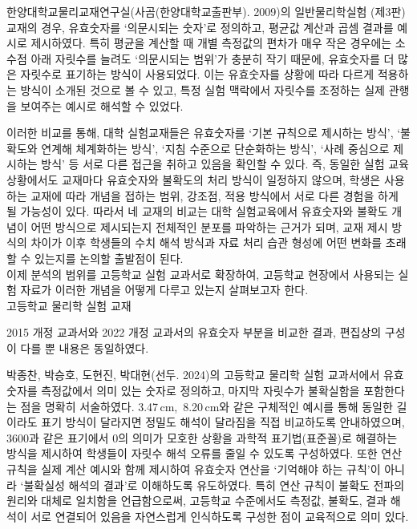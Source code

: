 한양대학교물리교재연구실(사곰(한양대학교출판부). 2009)의
일반물리학실험 (제3판) 교재의 경우,
유효숫자를 `의문시되는 숫자'로 정의하고, 평균값 계산과 곱셈 결과를 예시로 제시하였다.
특히 평균을 계산할 때 개별 측정값의 편차가 매우 작은 경우에는 소수점 아래 자릿수를 늘려도
`의문시되는 범위'가 충분히 작기 때문에, 유효숫자를 더 많은 자릿수로 표기하는 방식이 사용되었다.
이는 유효숫자를 상황에 따라 다르게 적용하는 방식이 소개된 것으로 볼 수 있고,
특정 실험 맥락에서 자릿수를 조정하는 실제 관행을 보여주는 예시로 해석할 수 있었다.

이러한 비교를 통해, 대학 실험교재들은 유효숫자를 `기본 규칙으로 제시하는 방식',
`불확도와 연계해 체계화하는 방식', `지침 수준으로 단순화하는 방식',
`사례 중심으로 제시하는 방식' 등 서로 다른 접근을 취하고 있음을 확인할 수 있다.
%
즉, 동일한 실험 교육 상황에서도 교재마다 유효숫자와 불확도의 처리 방식이 일정하지 않으며,
학생은 사용하는 교재에 따라 개념을 접하는 범위, 강조점, 적용 방식에서
서로 다른 경험을 하게 될 가능성이 있다.
%
따라서 네 교재의 비교는 대학 실험교육에서 유효숫자와 불확도 개념이 어떤 방식으로
제시되는지 전체적인 분포를 파악하는 근거가 되며,
교재 제시 방식의 차이가 이후 학생들의 수치 해석 방식과 자료 처리 습관 형성에
어떤 변화를 초래할 수 있는지를 논의할 출발점이 된다. \\

이제 분석의 범위를 고등학교 실험 교과서로 확장하여,
고등학교 현장에서 사용되는 실험 자료가 이러한 개념을 어떻게 다루고 있는지 살펴보고자 한다. \\

\ganada 고등학교 물리학 실험 교재

2015 개정 교과서와 2022 개정 교과서의 유효숫자 부분을 비교한 결과,
편집상의 구성이 다를 뿐 내용은 동일하였다.

박종찬, 박승호, 도현진, 박대현(선두. 2024)의
고등학교 물리학 실험 교과서에서 유효숫자를 측정값에서 의미 있는 숫자로 정의하고,
마지막 자릿수가 불확실함을 포함한다는 점을 명확히 서술하였다.
%
3.47\,cm,\, 8.20\,cm와 같은 구체적인 예시를 통해 동일한 길이라도 표기 방식이 달라지면
정밀도 해석이 달라짐을 직접 비교하도록 안내하였으며,
3600과 같은 표기에서 0의 의미가 모호한 상황을 과학적 표기법(표준꼴)로
해결하는 방식을 제시하여 학생들이 자릿수 해석 오류를 줄일 수 있도록 구성하였다.
%
또한 연산 규칙을 실제 계산 예시와 함께 제시하여
유효숫자 연산을 `기억해야 하는 규칙'이 아니라 `불확실성 해석의 결과'로 이해하도록 유도하였다.
특히 연산 규칙이 불확도 전파의 원리와 대체로 일치함을 언급함으로써,
고등학교 수준에서도 측정값, 불확도, 결과 해석이 서로 연결되어 있음을 자연스럽게 인식하도록
구성한 점이 교육적으로 의미 있다.

